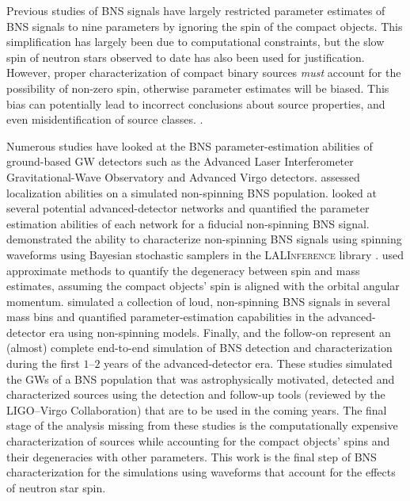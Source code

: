 Previous studies of BNS signals have largely restricted parameter estimates of BNS signals to nine parameters by ignoring the spin of the compact objects. This simplification has largely been due to computational constraints, but the slow spin of neutron stars observed to date \citep[e.g.,][]{Mandel_2010} has also been used for justification. However, proper characterization of compact binary sources \emph{must} account for the possibility of non-zero spin, otherwise parameter estimates will be biased.  This bias can potentially lead to incorrect conclusions about source properties, and even misidentification of source classes. \citep{Buonanno_2009,Berry_2014}.

Numerous studies have looked at the BNS parameter-estimation abilities of ground-based GW detectors such as the Advanced Laser Interferometer Gravitational-Wave Observatory \citep[aLIGO;][]{Aasi_2015} and Advanced Virgo \citep[AdV;][]{Acernese_2014} detectors. \citet{Nissanke_2010,Nissanke_2011} assessed localization abilities on a simulated non-spinning BNS population. \citet{Veitch_2012} looked at several potential advanced-detector networks and quantified the parameter estimation abilities of each network for a fiducial non-spinning BNS signal. \citet{Aasi_2013} demonstrated the ability to characterize non-spinning BNS signals using spinning waveforms using Bayesian stochastic samplers in the \textsc{LALInference} library \citep{Veitch_2014}.  \citet{Hannam_2013} used approximate methods to quantify the degeneracy between spin and mass estimates, assuming the compact objects' spin is aligned with the orbital angular momentum. \citet{Rodriguez_2014} simulated a collection of loud, non-spinning BNS signals in several mass bins and quantified parameter-estimation capabilities in the advanced-detector era using non-spinning models.  Finally, \citet{Singer_2014} and the follow-on \citet{Berry_2014} represent an (almost) complete end-to-end simulation of BNS detection and characterization during the first $1$--$2$ years of the advanced-detector era. These studies simulated the GWs of a BNS population that was astrophysically motivated, detected and characterized sources using the detection and follow-up tools (reviewed by the LIGO--Virgo Collaboration) that are to be used in the coming years.   The final stage of the analysis missing from these studies is the computationally expensive characterization of sources while accounting for the compact objects' spins and their degeneracies with other parameters.  This work is the final step of BNS characterization for the \citet{Singer_2014} simulations using waveforms that account for the effects of neutron star spin.